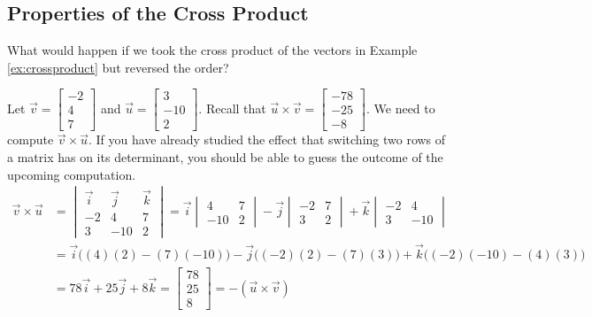 \documentclass{ximera}
\begin{document}
\subsection*{Properties of the Cross Product}
 
 
\begin{exploration}\label{init:crossproduct2}
What would happen if we took the cross product of the vectors in Example \ref{ex:crossproduct} but reversed the order?
 
Let $\vec{v}=\begin{bmatrix}-2\\ 4\\ 7\end{bmatrix}$ and $\vec{u}=\begin{bmatrix}3\\ -10\\ 2\end{bmatrix}$.
Recall that $\vec{u}\times\vec{v}=\begin{bmatrix}-78\\-25\\-8\end{bmatrix}$.  We need to compute $\vec{v}\times\vec{u}$.  If you have already studied the effect that switching two rows of a matrix has on its determinant, you should be able to guess the outcome of the upcoming computation.
\begin{align*}
\vec{v}\times \vec{u}&=
\begin{vmatrix}
\vec{i} & \vec{j} & \vec{k}\\
-2 &4 &7\\
3 & -10 &2
\end{vmatrix} =\vec{i}
\begin{vmatrix}
4 & 7\\
-10 & 2
\end{vmatrix} -\vec{j}
\begin{vmatrix}
-2 & 7\\
3 & 2
\end{vmatrix} +\vec{k}
\begin{vmatrix}
-2 & 4\\
3 & -10
\end{vmatrix}\\
&=\vec{i}\Big((4)(2)-(7)(-10)\Big)-\vec{j}\Big((-2)(2)-(7)(3)\Big)+\vec{k}\Big((-2)(-10)-(4)(3)\Big)\\
&=78\vec{i}+25\vec{j}+8\vec{k}
=\begin{bmatrix}78\\ 25\\ 8\end{bmatrix}=-(\vec{u}\times\vec{v})
\end{align*}
 

\end{exploration}
\end{document}
